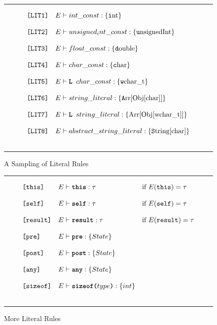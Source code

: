 \documentclass[12pt]{article} %
\newcommand{\reserved}[1]{\textbf{\texttt{#1}}} %
\newcommand{\RULELAB}[1]{\texttt{#1}}
\newcommand{\UNSPACEFORBOX}{\vspace{-2ex}}
\newcommand{\HLINE}{\UNSPACEFORBOX%
\begin{flushleft}\rule{\textwidth}{0.01in}\end{flushleft}%
\UNSPACEFORBOX}
\newenvironment{BFIGURE}{

\begin{figure}
\small
\HLINE
}{
\HLINE
\normalsize
\end{figure}
}
\begin{document}
\label{literalrules}
\begin{BFIGURE}
\begin{displaymath}
\begin{array}{lll}
\RULELAB{[LIT1]} &
E \vdash int\_const:\{\mbox{\texttt int}\}
\\
~\\
\RULELAB{[LIT2]} &
E \vdash unsigned_ int\_const:\{\mbox{\texttt unsignedInt}\}
\\
~\\
\RULELAB{[LIT3]} &
E \vdash float\_const:\{\mbox{\texttt double}\}
\\
~\\
\RULELAB{[LIT4]} &
E \vdash char\_const:\{\mbox{\texttt char}\}
\\
~\\
\RULELAB{[LIT5]} &
E \vdash \mbox{\reserved{L }}char\_const:\{\mbox{\texttt wchar\_t}\}
\\
~\\
\RULELAB{[LIT6]} &
E \vdash string\_literal:\{\mbox{\texttt Arr[Obj[char]]}\}
\\
~\\
\RULELAB{[LIT7]} &
E \vdash \mbox{\reserved{L }}string\_literal:\{\mbox{Arr[Obj[wchar\_t]]}\}
\\
~\\
\RULELAB{[LIT8]} &
E \vdash abstract\_string\_literal:\{\mbox{\texttt String[char]}\}
\\
~\\
\end{array}
\end{displaymath}
\caption{A Sampling of Literal Rules}
\label{fig-lit}
\end{BFIGURE}
\begin{BFIGURE}
\begin{displaymath}
\begin{array}{lll}
\RULELAB{[this]} &
E \vdash \mbox{\reserved{this}}:\tau
& 
\mbox{if $E(\mbox{\tt this}) = \tau$}
\\
~\\
\RULELAB{[self]} &
E \vdash \mbox{\reserved{self}}:\tau
& 
\mbox{if $E(\mbox{\tt self}) = \tau$}
\\
~\\
\RULELAB{[result]} &
E \vdash \mbox{\reserved{result}}:\tau
& 
\mbox{if $E(\mbox{\texttt{result}}) = \tau$}
\\
~\\
\RULELAB{[pre]} &
E \vdash \mbox{\reserved{pre}}:\{State\}
\\
~\\
\RULELAB{[post]} &
E \vdash \mbox{\reserved{post}}:\{State\}
\\
~\\
\RULELAB{[any]} &
E \vdash \mbox{\reserved{any}}:\{State\}
\\
~\\
\RULELAB{[sizeof]} &
E \vdash \mbox{\reserved{sizeof(}}type\mbox{\reserved{)}}:\{int\}
\\
~\\
\end{array}
\end{displaymath}
\caption{More Literal Rules}
\label{fig-cpplit}
\end{BFIGURE}
\end{document}
